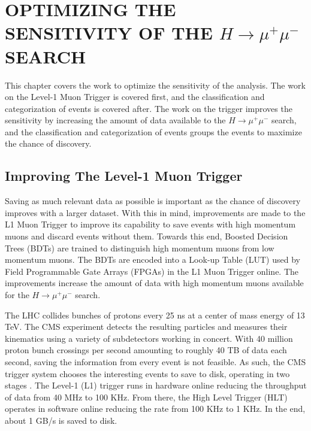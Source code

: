 \chapter{OPTIMIZING THE SENSITIVITY OF THE $H\rightarrow\mu^+\mu^-$ SEARCH} \label{optimize}

This chapter covers the work to optimize the sensitivity of the analysis. The work on the Level-1 Muon Trigger is covered first, and the classification and categorization of events is covered after. The work on the trigger improves the sensitivity by increasing the amount of data available to the $H\rightarrow\mu^+\mu^-$ search, and the classification and categorization of events groups the events to maximize the chance of discovery.  

\section{Improving The Level-1 Muon Trigger}

Saving as much relevant data as possible is important as the chance of discovery improves with a larger dataset. With this in mind, improvements are made to the L1 Muon Trigger to improve its capability to save events with high momentum muons and discard events without them. Towards this end, Boosted Decision Trees (BDTs) are trained to distinguish high momentum muons from low momentum muons. The BDTs are encoded into a Look-up Table (LUT) used by Field Programmable Gate Arrays (FPGAs) in the L1 Muon Trigger online. The improvements increase the amount of data with high momentum muons available for the $H\rightarrow \mu^+\mu^-$ search. 

The LHC collides bunches of protons every 25 ns at a center of mass energy of 13 TeV. The CMS experiment detects the resulting particles and measures their kinematics using a variety of subdetectors working in concert. With 40 million proton bunch crossings per second amounting to roughly 40 TB of data each second, saving the information from every event is not feasible. As such, the CMS trigger system chooses the interesting events to save to disk, operating in two stages \cite{Khachatryan:2016bia}. The Level-1 (L1) trigger runs in hardware online reducing the throughput of data from 40 MHz to 100 KHz. From there, the High Level Trigger (HLT) operates in software online reducing the rate from 100 KHz to 1 KHz. In the end, about 1 GB/s is saved to disk.

